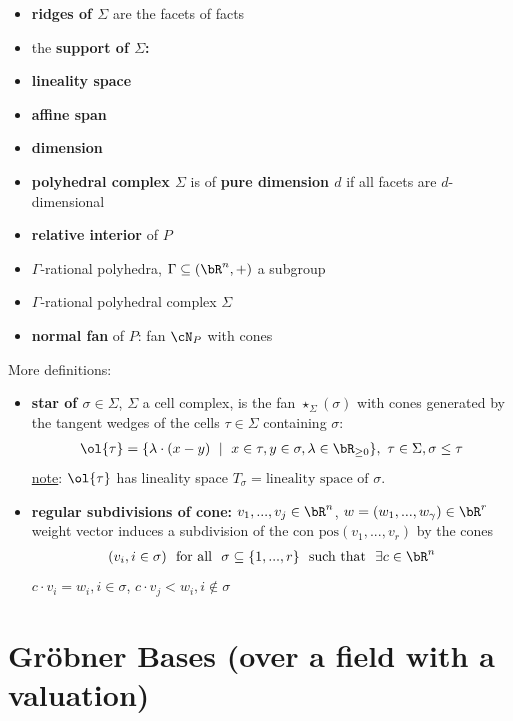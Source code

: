 \begin{itemize}
  \item \textbf{ridges of $\Sigma$} are the facets of facts
  \item the \textbf{support of $\Sigma$:}
  \item \textbf{lineality space}
  \item \textbf{affine span}
  \item \textbf{dimension}
  \item \textbf{polyhedral complex $\Sigma$} is of \textbf{pure dimension $d$} if all facets are $d$-dimensional
  \item \textbf{relative interior} of $P$
  \item $\Gamma$-rational polyhedra, $\Gamma \subseteq (\bR^n,+)$ a subgroup
  \item $\Gamma$-rational polyhedral complex $\Sigma$
  \item \textbf{normal fan} of $P$: fan $\cN_P$ with cones
\end{itemize}

 More definitions:
\begin{itemize}
  \item \textbf{star of $\sigma \in \Sigma$}, $\Sigma$ a cell complex, is the fan $\star_\Sigma(\sigma)$ with cones generated by the tangent wedges of the cells $\tau \in \Sigma$ containing $\sigma$:
    \begin{align*}
      \ol{\tau} = \{\lambda \cdot (x - y) ~\mid~ x \in \tau, y \in \sigma, \lambda \in \bR_{\geq 0}\}, ~ \tau \in \Sigma, \sigma \leq \tau
    \end{align*}
    \ul{note}: $\ol{\tau}$ has lineality space $T_\sigma = \text{lineality space of } \sigma$.
  \item \textbf{regular subdivisions of cone:} $v_1,...,v_j \in \bR^n$, $w = (w_1,...,w_\gamma) \in \bR^r$ weight vector induces a subdivision of the con $\text{pos}(v_1,...,v_r)$ by the cones
    \begin{align*}
      (v_i, i \in \sigma) ~\text{ for all } ~\sigma \subseteq \{1,...,r\} ~\text{ such that } ~ \exists c \in \bR^n
    \end{align*}
    $c \cdot v_i = w_i, i\in \sigma$, $c\cdot v_j < w_i, i\not\in \sigma$
\end{itemize}

    \section{Gr\"obner Bases (over a field with a valuation)}

